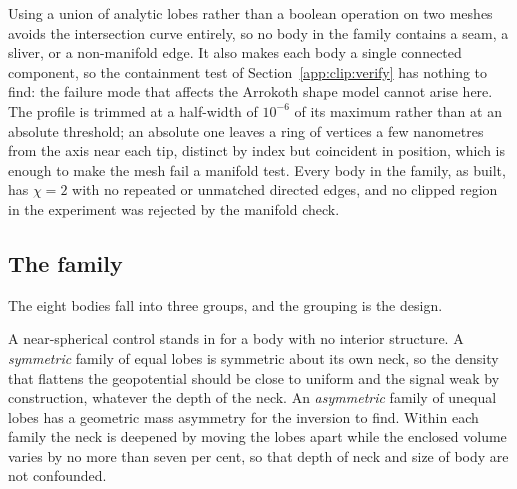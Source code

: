 Using a union of analytic lobes rather than a boolean operation on two meshes
avoids the intersection curve entirely, so no body in the family contains a
seam, a sliver, or a non-manifold edge. It also makes each body a single
connected component, so the containment test of
Section~\ref{app:clip:verify} has nothing to find: the failure mode that
affects the Arrokoth shape model cannot arise here. The profile is trimmed at a half-width
of $10^{-6}$ of its maximum rather than at an absolute threshold; an absolute
one leaves a ring of vertices a few nanometres from the axis near each tip,
distinct by index but coincident in position, which is enough to make the mesh
fail a manifold test. Every body in the family, as built, has
$\chi = 2$ with no repeated or unmatched directed edges, and no clipped region
in the experiment was rejected by the manifold check.

\subsection{The family}
\label{app:synth:family}

The eight bodies fall into three groups, and the grouping is the design.

A near-spherical control stands in for a body with no interior structure. A
\emph{symmetric} family of equal lobes is symmetric about its own neck, so the
density that flattens the geopotential should be close to uniform and the
signal weak by construction, whatever the depth of the neck. An
\emph{asymmetric} family of unequal lobes has a geometric mass asymmetry for
the inversion to find. Within each family the neck is deepened by moving the
lobes apart while the enclosed volume varies by no more than seven per cent, so
that depth of neck and size of body are not confounded.

